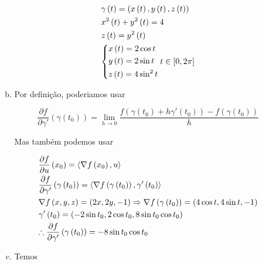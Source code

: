\documentclass[11pt, oneside, a4paper]{gsm-l}
\begin{document}
\begin{enumerate}
\begin{sol}
\begin{enumerate}[(a)]
\[
\begin{gathered}
  \gamma \left( t \right) = \left( {x\left( t \right),y\left( t \right),z\left( t \right)} \right) \hfill \\
  x^2 \left( t \right) + y^2 \left( t \right) = 4 \hfill \\
  z\left( t \right) = y^2 \left( t \right) \hfill \\
  \left\{ \begin{gathered}
  x\left( t \right) = 2\cos t \hfill \\
  y\left( t \right) = 2\sin t \hfill \\
  z\left( t \right) = 4\sin ^2 t \hfill \\
\end{gathered}  \right.t \in \left[ {0,2\pi } \right] \hfill \\
\end{gathered}
\]

  \item Por defini\c{c}ão, poderiamos usar

\[
\frac{{\partial f}}
{{\partial \gamma '}}\left( {\gamma \left( {t_0 } \right)} \right) = \mathop {\lim }\limits_{h \to 0} \frac{{f\left( {\gamma \left( {t_0 } \right) + h\gamma '\left( {t_0 } \right)} \right) - f\left( {\gamma \left( {t_0 } \right)} \right)}}
{h}
\]

Mas também podemos usar

\[
\begin{gathered}
  \frac{{\partial f}}
{{\partial u}}\left( {x_0 } \right) = \left\langle {\nabla f\left( {x_0 } \right),u} \right\rangle  \hfill \\
  \frac{{\partial f}}
{{\partial \gamma '}}\left( {\gamma \left( {t_0 } \right)} \right) = \left\langle {\nabla f\left( {\gamma \left( {t_0 } \right)} \right),\gamma '\left( {t_0 } \right)} \right\rangle  \hfill \\
  \nabla f\left( {x,y,z} \right) = \left( {2x,2y, - 1} \right) \Rightarrow \nabla f\left( {\gamma \left( {t_0 } \right)} \right) = \left( {4\cos t,4\sin t, - 1} \right) \hfill \\
  \gamma '\left( {t_0 } \right) = \left( { - 2\sin t_0 ,2\cos t_0 ,8\sin t_0 \cos t_0 } \right) \hfill \\
  \therefore \frac{{\partial f}}
{{\partial \gamma '}}\left( {\gamma \left( {t_0 } \right)} \right) =  - 8\sin t_0 \cos t_0  \hfill \\
\end{gathered}
\]


  \item Temos


\end{enumerate}
\end{sol}
\end{enumerate}
\end{document}
